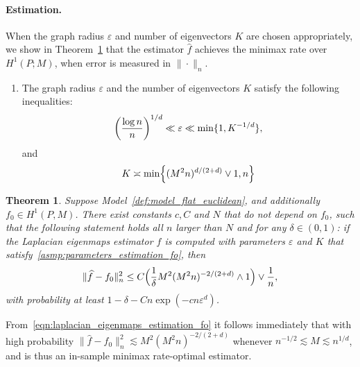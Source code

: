 \documentclass{article}
\newcommand{\1}{\mathbf{1}}
\newcommand{\wh}[1]{\widehat{#1}}
\theoremstyle{alden}
\theoremstyle{aldenthm}
\newtheorem{theorem}{Theorem}
\theoremstyle{definition}
\theoremstyle{remark}
\begin{document}
\paragraph{Estimation.} When the graph radius $\varepsilon$ and number of eigenvectors $K$ are chosen appropriately, we show in Theorem~\ref{thm:laplacian_eigenmaps_estimation_fo} that the estimator $\wh{f}$ achieves the minimax rate over $H^1(P;M)$, when error is measured in $\|\cdot\|_{n}$.
\begin{enumerate}[label=(A\arabic*)]
	\setcounter{enumi}{0}
	\item 
	\label{asmp:parameters_estimation_fo} 
	The graph radius $\varepsilon$ and the number of eigenvectors $K$ satisfy the following inequalities:
	\begin{equation}\\
	\label{eqn:radius_fo} 
	\biggl(\frac{\log n}{n}\biggr)^{1/d} \ll \varepsilon \ll \min\{1,K^{-1/d}\},
	\end{equation}
	and 
	\begin{equation}
	\label{eqn:eigenvector_estimation_fo} 
	K \asymp \min\Bigl\{(M^2n)^{d/(2 + d)} \vee 1, n\Bigr\}
	\end{equation}
\end{enumerate}
\begin{theorem}
	\label{thm:laplacian_eigenmaps_estimation_fo}
	Suppose Model~\ref{def:model_flat_euclidean}, and additionally $f_0 \in H^1(P,M)$. There exist constants $c,C$ and $N$ that do not depend on $f_0$, such that the following statement holds all $n$ larger than $N$ and for any $\delta \in (0,1)$: if the Laplacian eigenmaps estimator $\wh{f}$ is computed with parameters $\varepsilon$ and $K$ that satisfy~\ref{asmp:parameters_estimation_fo}, then
	\begin{equation}
	\label{eqn:laplacian_eigenmaps_estimation_fo}
	\|\wh{f} - f_0\|_n^2 \leq C\Bigl(\frac{1}{\delta}M^2(M^2n)^{-2/(2 + d)} \wedge 1\Bigr) \vee \frac{1}{n},
	\end{equation}
	with probability at least $1 - \delta - Cn\exp(-cn\varepsilon^d)$.
\end{theorem}
From~\eqref{eqn:laplacian_eigenmaps_estimation_fo} it follows immediately that with high probability $\|\wh{f} - f_0\|_n^2 \lesssim M^2(M^2n)^{-2/(2 + d)}$ whenever $n^{-1/2} \lesssim M \lesssim n^{1/d}$, and is thus an in-sample minimax rate-optimal estimator.
\end{document}

